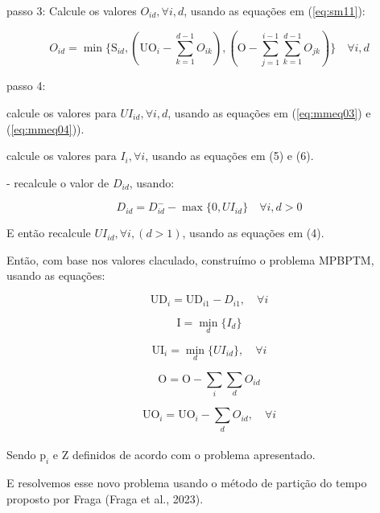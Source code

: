 \documentclass[authoryear,preprint,12pt]{elsarticle}
\begin{document}
passo 3: Calcule os valores $O_{id}, \forall i, d$, usando as equações em (\ref{eq:sm11}):

\begin{equation}
\label{eq:sm11}
O_{id} = \min \{\textrm{S}_{id}, (\textrm{UO}_i - \sum_{k=1}^{d-1}{O_{ik}}) , (\textrm{O}- \sum_{j=1}^{i-1}\sum_{k=1}^{d-1}{O_{jk}}) \} \quad \forall i, d
\end{equation}

passo 4: 

calcule os valores para $UI_{id}, \forall i, d$, usando as equações em (\ref{eq:mmeq03}) e (\ref{eq:mmeq04})).

calcule os valores para $I_{i}, \forall i$, usando as equações em (5) e (6). 

- recalcule o valor de $D_{id}$, usando:

\begin{equation}
D_{id} = D_{id}^- - \max\{0, UI_{id}\} \quad \forall i, d>0
\end{equation}

E então recalcule $UI_{id}, \forall i, (d>1)$, usando as equações em (4).


Então, com base nos valores claculado, construímo o problema MPBPTM, usando as equações:

\begin{equation}
\textrm{UD}_{i} = \textrm{UD}_{i1} - D_{i1}, \quad \forall i
\end{equation}

\begin{equation}
\textrm{I} = \min_{d} \{I_{d}\}
\end{equation}

\begin{equation}
\textrm{UI}_{i} = \min_{d} \{UI_{id}\}, \quad \forall{i}
\end{equation}

\begin{equation}
\textrm{O} = \textrm{O} - \sum_{i}{\sum_{d}{O_{id}}}
\end{equation}

\begin{equation}
\textrm{UO}_{i} = \textrm{UO}_{i} - \sum_{d}{O_{id}}, \quad \forall i
\end{equation} \\

Sendo $\textrm{p}_{i}$ e $\textrm{Z}$ definidos de acordo com o problema apresentado.

E resolvemos esse novo problema usando o método de partição do tempo proposto por Fraga (Fraga et al., 2023).\\
\end{document}

